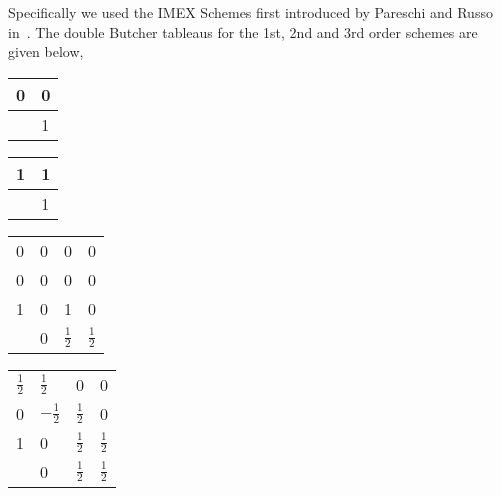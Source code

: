 Specifically we used the IMEX Schemes first introduced by Pareschi and Russo
in~\cite{article:pareschi2000IMEX, article:pareschi2005IMEX}.
The double Butcher tableaus for the 1st, 2nd and 3rd order schemes are given below,
\begin{center}
  \begin{tabular}{r|l}
    0 & 0 \\
    \midrule
      & 1
  \end{tabular}\hspace{0.5cm}
  \begin{tabular}{r|l}
    1 & 1 \\
    \midrule
      & 1
  \end{tabular}
\end{center}
\begin{center}
  \begin{tabular}{r|lll}
    0 & 0 & 0 & 0 \\
    0 & 0 & 0 & 0 \\
    1 & 0 & 1 & 0 \\
    \midrule
      & 0 & \(\frac{1}{2}\) & \(\frac{1}{2}\) \\
  \end{tabular}\hspace{0.5cm}
  \begin{tabular}{r|lll}
    \(\frac{1}{2}\) & \(\frac{1}{2}\) & 0 & 0 \\
    0 & \(-\frac{1}{2}\) & \(\frac{1}{2}\) & 0 \\
    1 & 0 & \(\frac{1}{2}\) & \(\frac{1}{2}\) \\
    \midrule
      & 0 & \(\frac{1}{2}\) & \(\frac{1}{2}\) \\
  \end{tabular}
\end{center}
